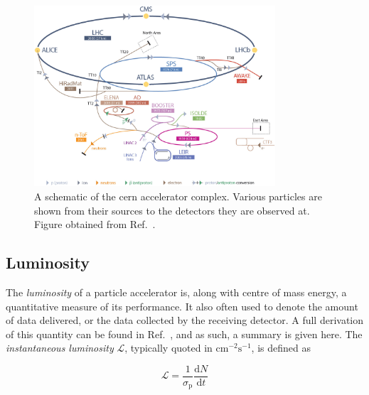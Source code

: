 \begin{figure}[htbp]
    \centering
    \includegraphics[width=0.8\textwidth]{figures/CERN_accelerator_complex.jpg}
    \caption[A schematic of the \acrshort{cern} accelerator complex]{A schematic of the \acrshort{cern} accelerator complex. Various particles are shown from their sources to the detectors they are observed at. Figure obtained from Ref.~.}
    \label{fig:cern_accelerator_complex}
\end{figure}





\subsection{Luminosity}
\label{subsec:luminosity}

The \emph{luminosity} of a particle accelerator is, along with centre of mass energy, a quantitative measure of its performance. It also often used to denote the amount of data delivered, or the data collected by the receiving detector. A full derivation of this quantity can be found in Ref.~, and as such, a summary is given here. The \emph{instantaneous luminosity} $\mathcal{L}$, typically quoted in $\text{cm}^{-2}\text{s}^{-1}$, is defined as

\begin{equation}
    \mathcal{L} = \frac{1}{\sigma_{\mathrm{p}}} \frac{\mathrm{d}N}{\mathrm{d}t}
    \label{eq:lumi_instantaneous}
\end{equation}

